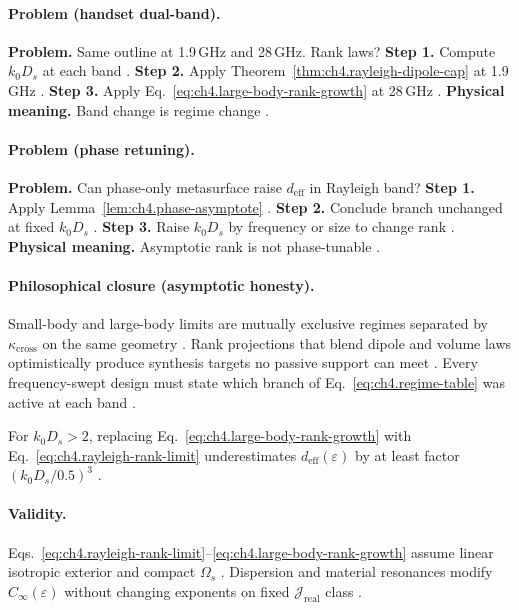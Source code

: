 \paragraph{Problem (handset dual-band).}
\textbf{Problem.} Same outline at 1.9\,GHz and 28\,GHz. Rank laws?
\textbf{Step 1.} Compute \(k_{0}D_{s}\) at each band \cite{jackson1999}.
\textbf{Step 2.} Apply Theorem~\ref{thm:ch4.rayleigh-dipole-cap} at 1.9\,GHz \cite{stratton1941}.
\textbf{Step 3.} Apply Eq.~\eqref{eq:ch4.large-body-rank-growth} at 28\,GHz \cite{hansen1988,harrington2001}.
\textbf{Physical meaning.} Band change is regime change \cite{devaney2004,collin2001}.

\paragraph{Problem (phase retuning).}
\textbf{Problem.} Can phase-only metasurface raise \(d_{\mathrm{eff}}\) in Rayleigh band?
\textbf{Step 1.} Apply Lemma~\ref{lem:ch4.phase-asymptote} \cite{devaney2004,harrington2001}.
\textbf{Step 2.} Conclude branch unchanged at fixed \(k_{0}D_{s}\) \cite{stratton1941,hansen1988}.
\textbf{Step 3.} Raise \(k_{0}D_{s}\) by frequency or size to change rank \cite{jackson1999}.
\textbf{Physical meaning.} Asymptotic rank is not phase-tunable \cite{harrington2001}.

\paragraph{Philosophical closure (asymptotic honesty).}
Small-body and large-body limits are mutually exclusive regimes separated by \(\kappa_{\mathrm{cross}}\) on the same geometry
\cite{jackson1999,stratton1941,hansen1988,harrington2001}. Rank projections that blend dipole and volume laws optimistically produce synthesis targets
no passive support can meet \cite{devaney2004}. Every frequency-swept design must state which branch of Eq.~\eqref{eq:ch4.regime-table} was active at
each band \cite{stratton1941,hansen1988}.

\begin{corollary}
\label{cor:ch4.no-dipole-extrap}
For \(k_{0}D_{s}>2\), replacing Eq.~\eqref{eq:ch4.large-body-rank-growth} with Eq.~\eqref{eq:ch4.rayleigh-rank-limit} underestimates
\(d_{\mathrm{eff}}(\varepsilon)\) by at least factor \((k_{0}D_{s}/0.5)^{3}\) \cite{jackson1999,hansen1988,stratton1941,harrington2001}.
\end{corollary}

\paragraph{Validity.}
Eqs.~\eqref{eq:ch4.rayleigh-rank-limit}--\eqref{eq:ch4.large-body-rank-growth} assume linear isotropic exterior and compact \(\Omega_{s}\)
\cite{stratton1941}. Dispersion and material resonances modify \(C_{\infty}(\varepsilon)\) without changing exponents on fixed \(\mathcal{J}_{\mathrm{real}}\)
class \cite{jackson1999,hansen1988,harrington2001,devaney2004}.
